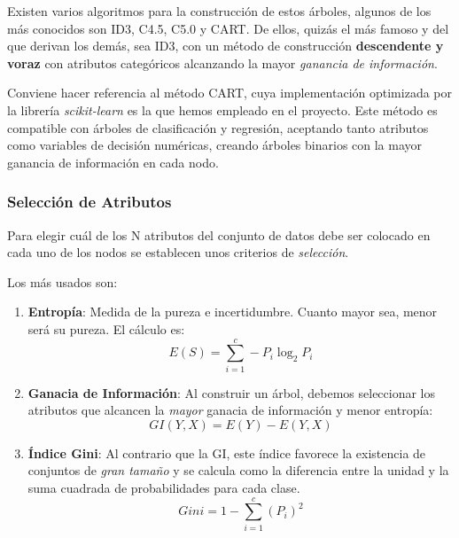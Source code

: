 Existen varios algoritmos para la construcción de estos árboles, algunos de los más conocidos son ID3, C4.5, C5.0 y CART.  
De ellos, quizás el más famoso y del que derivan los demás, sea ID3, con un método de construcción \textbf{descendente y voraz} con atributos categóricos alcanzando la mayor \textit{ganancia de información}.

Conviene hacer referencia al método CART, cuya implementación optimizada por la librería \textit{scikit-learn} es la que hemos empleado en el proyecto. Este método es compatible con árboles de clasificación y regresión, aceptando tanto atributos como variables de decisión numéricas, creando árboles binarios con la mayor ganancia de información en cada nodo.\cite{Belyadi2021SupervisedLearning}

\subsubsection{Selección de Atributos}

Para elegir cuál de los N atributos del conjunto de datos debe ser colocado en cada uno de los nodos se establecen unos criterios de \textit{selección}.

Los más usados son:

\begin{enumerate}
    \item \textbf{Entropía}: Medida de la pureza e incertidumbre. Cuanto mayor sea, menor será su pureza. El cálculo es\cite{Belyadi2021SupervisedLearning}: \begin{equation}
        E(S) = \sum_{i=1}^{c}-P_{i}\log_{2}P_{i} 
    \end{equation}
    \item \textbf{Ganacia de Información}: Al construir un árbol, debemos seleccionar los atributos que alcancen la \textit{mayor} ganacia de información y menor entropía: \begin{equation}
        GI(Y,X) = E(Y) - E(Y,X)
    \end{equation}
    \item \textbf{Índice Gini}: Al contrario que la GI, este índice favorece la existencia de conjuntos de \textit{gran tamaño} y se calcula como la diferencia entre la unidad y la suma cuadrada de probabilidades para cada clase. \begin{equation}
        Gini = 1 - \sum_{i=1}^{c}(P_{i})^2
    \end{equation}
\end{enumerate}

